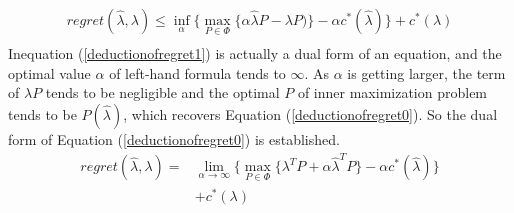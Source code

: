 \documentclass[journal]{IEEEtran}
\begin{document}
\begin{equation}
  \label{deductionofregret1}
  \begin{aligned}
    regret(\hat{\lambda}, \lambda) \leq \inf_{\alpha} \Big\{ 
      \max_{P \in \Phi} \{ 
        \alpha \hat{\lambda}P - \lambda P) \} 
        - \alpha c^*(\hat{\lambda}) \Big\} 
        + c^*(\lambda) \\
  \end{aligned}
\end{equation}
Inequation (\ref{deductionofregret1}) is actually a dual form of an equation, and the optimal value $\alpha$ of left-hand formula tends to $\infty$. As $\alpha$ is getting larger, the term of $\lambda P$ tends to be negligible and the optimal $P$ of inner maximization problem tends to be $P(\hat{\lambda})$, which recovers Equation (\ref{deductionofregret0}). So the dual form of Equation (\ref{deductionofregret0}) is established.
\begin{equation}
  \label{lossofregret1}
  \begin{aligned}
    regret(\hat{\lambda}, \lambda) = & \lim_{\alpha \to \infty } \Big \{ \max_{P \in \Phi} \{\lambda^T P + \alpha \hat{\lambda}^T P \} - \alpha c^*(\hat{\lambda}) \Big\} \\
    & + c^*(\lambda)
  \end{aligned}
\end{equation}
\end{document}
